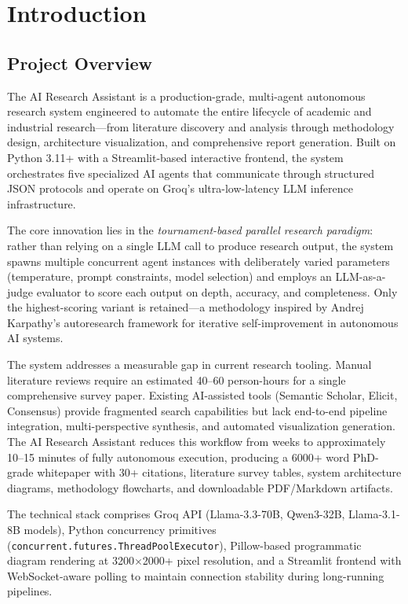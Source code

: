\chapter{Introduction}

\section{Project Overview}

The AI Research Assistant is a production-grade, multi-agent autonomous research system engineered to automate the entire lifecycle of academic and industrial research---from literature discovery and analysis through methodology design, architecture visualization, and comprehensive report generation. Built on Python 3.11+ with a Streamlit-based interactive frontend, the system orchestrates five specialized AI agents that communicate through structured JSON protocols and operate on Groq's ultra-low-latency LLM inference infrastructure.

The core innovation lies in the \textit{tournament-based parallel research paradigm}: rather than relying on a single LLM call to produce research output, the system spawns multiple concurrent agent instances with deliberately varied parameters (temperature, prompt constraints, model selection) and employs an LLM-as-a-judge evaluator to score each output on depth, accuracy, and completeness. Only the highest-scoring variant is retained---a methodology inspired by Andrej Karpathy's autoresearch framework for iterative self-improvement in autonomous AI systems.

The system addresses a measurable gap in current research tooling. Manual literature reviews require an estimated 40--60 person-hours for a single comprehensive survey paper. Existing AI-assisted tools (Semantic Scholar, Elicit, Consensus) provide fragmented search capabilities but lack end-to-end pipeline integration, multi-perspective synthesis, and automated visualization generation. The AI Research Assistant reduces this workflow from weeks to approximately 10--15 minutes of fully autonomous execution, producing a 6000+ word PhD-grade whitepaper with 30+ citations, literature survey tables, system architecture diagrams, methodology flowcharts, and downloadable PDF/Markdown artifacts.

The technical stack comprises Groq API (Llama-3.3-70B, Qwen3-32B, Llama-3.1-8B models), Python concurrency primitives (\texttt{concurrent.futures.ThreadPoolExecutor}), Pillow-based programmatic diagram rendering at 3200$\times$2000+ pixel resolution, and a Streamlit frontend with WebSocket-aware polling to maintain connection stability during long-running pipelines.

